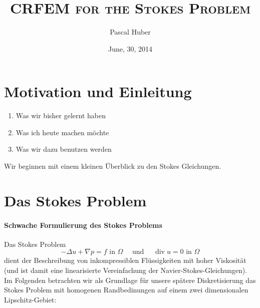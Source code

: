 \documentclass[a4paper]{scrartcl}
\DeclareMathOperator{\divOp}{div}
\theoremstyle{plain}
\theoremstyle{definition}
\theoremstyle{remark}
\begin{document}
\title{\textsc{CRFEM for the Stokes Problem}}
\author{Pascal Huber}
\date{June, 30, 2014}
\maketitle

\section{Motivation und Einleitung}
\label{sec:motiv-und-einl}

{\color{red}
  \begin{enumerate}
  \item Was wir bisher gelernt haben
  \item Was ich heute machen möchte
  \item Was wir dazu benutzen werden
  \end{enumerate}
}

\noindent Wir beginnen mit einem kleinen Überblick zu den Stokes Gleichungen. 

\section{Das Stokes Problem}
\label{sec:das-stokes-problem}

\paragraph{Schwache Formulierung des Stokes Problems}
\label{sec:schw-form-des}

Das Stokes Problem 
\begin{equation}
  \label{eq:1}
  -\Delta u + \nabla p = f \text{ in } \Omega \quad \text{ und }
  \quad \divOp u = 0 \text{ in } \Omega
\end{equation}
dient der Beschreibung von inkompressiblen
Flüssigkeiten mit hoher Viskosität (und ist damit eine linearisierte
Vereinfachung der Navier-Stokes-Gleichungen).\\ 

\noindent Im Folgenden betrachten wir als Grundlage für unsere spätere
Diskretisierung das Stokes Problem mit homogenen Randbedinungen auf
einem zwei dimensionalen Lipschitz-Gebiet: 
\end{document}
